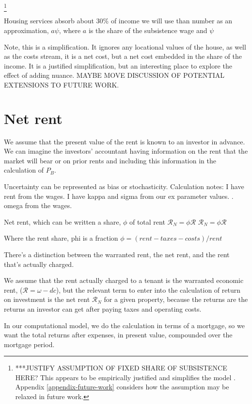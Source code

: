 \footnote{***JUSTIFY ASSUMPTION OF FIXED SHARE OF SUBSISTENCE HERE? This appears to be empirically justified and simplifies the model \cite{SOURCE_HOUSING_A_FIXED_SHARE_SUBSISTENCE_WAGE}. Appendix \ref{appendix-future-work} considers how the assumption may be relaxed in future work.}

Housing services absorb about 30\% of income  we will use than number  as an approximation,  $a\psi$, where $a$ is the share of the subsistence wage and $\psi$

Note, this is a simplification. It ignores any locational values of the house, as well as the costs stream, it is a net cost, but a net cost embedded in the share of the income. It is a justified simplification, but an interesting place to explore the effect of adding nuance.  MAYBE MOVE DISCUSSION OF POTENTIAL EXTENSIONS TO FUTURE WORK.

\section{Net rent}\label{SS:NetRent}
We assume that the present value of the rent %
is known to an investor in advance. We can imagine the investors' accountant having information on the rent that the market will bear or on prior rents and including this information in the calculation of $P_B$.

Uncertainty can be represented as bias or stochasticity.
Calculation notes: I have rent from the wages. I have kappa and sigma from our ex parameter values. . omega from the wages. 

Net rent, which can be written a share, $\phi$ of total rent $\mathcal{R}_N = \phi \mathcal{R}$
$\mathcal{R}_N = \phi \mathcal{R}$

Where the \gls{rent share}, phi is a fraction
$\phi = (rent-taxes-costs) /rent$ 

There's a distinction between the warranted rent, the net rent, and the rent that's actually charged.

We assume that the  rent  actually charged to a tenant is the warranted economic rent, ($\mathcal{R}= \omega - {dc}$), but the relevant term to enter into the calculation of return on investment is the net rent $\mathcal{R}_N$ for a given property, because the returns are the returns an investor can get after paying taxes and operating costs.

In our computational model, we do the calculation in terms of a mortgage, so we want the total returns after expenses, in present value, compounded over the mortgage  period.

